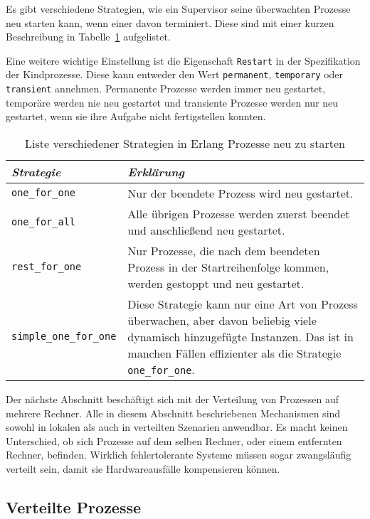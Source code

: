 Es gibt verschiedene Strategien, wie ein Supervisor seine überwachten Prozesse neu starten kann, wenn einer davon terminiert. Diese sind mit einer kurzen Beschreibung in Tabelle~\ref{tab:erlang-restart-strategy} aufgelistet.

Eine weitere wichtige Einstellung ist die Eigenschaft \lstinline{Restart} in der Spezifikation der Kindprozesse. Diese kann entweder den Wert \lstinline{permanent}, \lstinline{temporary} oder \lstinline{transient} annehmen. Permanente Prozesse werden immer neu gestartet, temporäre werden nie neu gestartet und transiente Prozesse werden nur neu gestartet, wenn sie ihre Aufgabe nicht fertigstellen konnten.

\begin{table}[!hbt]
\caption{Liste verschiedener Strategien in Erlang Prozesse neu zu starten}
\label{tab:erlang-restart-strategy}
\centering
\begin{tabular}{|l|p{8cm}|}
\hline
\emph{Strategie} & \emph{Erklärung} \\
\hline
\lstinline$one_for_one$ & Nur der beendete Prozess wird neu gestartet. \\
\hline
\lstinline$one_for_all$ & Alle übrigen Prozesse werden zuerst beendet und anschließend neu gestartet. \\
\hline
\lstinline$rest_for_one$ & Nur Prozesse, die nach dem beendeten Prozess in der Startreihenfolge kommen, werden gestoppt und neu gestartet. \\
\hline
\lstinline$simple_one_for_one$ & Diese Strategie kann nur eine Art von Prozess überwachen, aber davon beliebig viele dynamisch hinzugefügte Instanzen. Das ist in manchen Fällen effizienter als die Strategie \lstinline$one_for_one$. \\
\hline
\end{tabular}
\end{table}

Der nächste Abschnitt beschäftigt sich mit der Verteilung von Prozessen auf mehrere Rechner. Alle in diesem Abschnitt beschriebenen Mechanismen sind sowohl in lokalen als auch in verteilten Szenarien anwendbar. Es macht keinen Unterschied, ob sich Prozesse auf dem selben Rechner, oder einem entfernten Rechner, befinden. Wirklich fehlertolerante Systeme müssen sogar zwangsläufig verteilt sein, damit sie Hardwareausfälle kompensieren können.

\subsection{Verteilte Prozesse}

